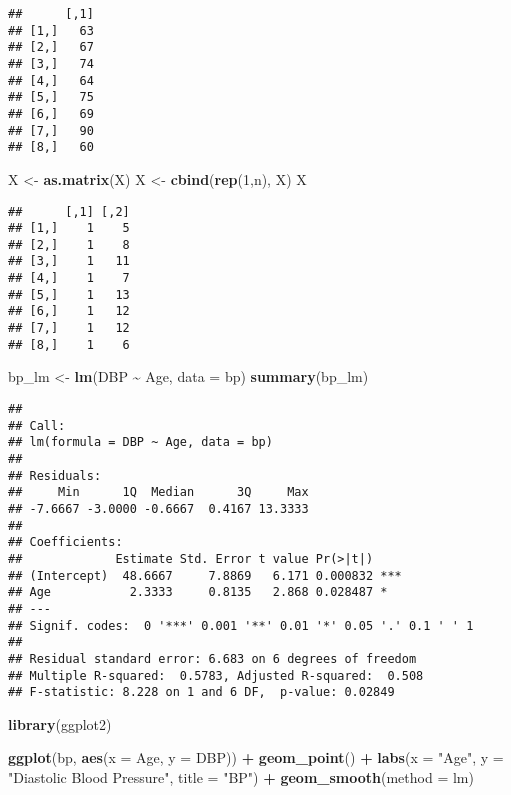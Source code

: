\documentclass[
]{article}
\newenvironment{Shaded}{\begin{snugshade}}{\end{snugshade}}
\newcommand{\AttributeTok}[1]{\textcolor[rgb]{0.13,0.29,0.53}{#1}}
\newcommand{\DecValTok}[1]{\textcolor[rgb]{0.00,0.00,0.81}{#1}}
\newcommand{\FunctionTok}[1]{\textcolor[rgb]{0.13,0.29,0.53}{\textbf{#1}}}
\newcommand{\NormalTok}[1]{#1}
\newcommand{\OtherTok}[1]{\textcolor[rgb]{0.56,0.35,0.01}{#1}}
\newcommand{\SpecialCharTok}[1]{\textcolor[rgb]{0.81,0.36,0.00}{\textbf{#1}}}
\newcommand{\StringTok}[1]{\textcolor[rgb]{0.31,0.60,0.02}{#1}}
\begin{document}
\begin{verbatim}
##      [,1]
## [1,]   63
## [2,]   67
## [3,]   74
## [4,]   64
## [5,]   75
## [6,]   69
## [7,]   90
## [8,]   60
\end{verbatim}

\begin{Shaded}
\begin{Highlighting}[]
\NormalTok{X }\OtherTok{\textless{}{-}} \FunctionTok{as.matrix}\NormalTok{(X)}
\NormalTok{X }\OtherTok{\textless{}{-}} \FunctionTok{cbind}\NormalTok{(}\FunctionTok{rep}\NormalTok{(}\DecValTok{1}\NormalTok{,n), X)}
\NormalTok{X}
\end{Highlighting}
\end{Shaded}

\begin{verbatim}
##      [,1] [,2]
## [1,]    1    5
## [2,]    1    8
## [3,]    1   11
## [4,]    1    7
## [5,]    1   13
## [6,]    1   12
## [7,]    1   12
## [8,]    1    6
\end{verbatim}

\begin{Shaded}
\begin{Highlighting}[]
\NormalTok{bp\_lm }\OtherTok{\textless{}{-}} \FunctionTok{lm}\NormalTok{(DBP }\SpecialCharTok{\textasciitilde{}}\NormalTok{ Age, }\AttributeTok{data =}\NormalTok{ bp)}
\FunctionTok{summary}\NormalTok{(bp\_lm)}
\end{Highlighting}
\end{Shaded}

\begin{verbatim}
## 
## Call:
## lm(formula = DBP ~ Age, data = bp)
## 
## Residuals:
##     Min      1Q  Median      3Q     Max 
## -7.6667 -3.0000 -0.6667  0.4167 13.3333 
## 
## Coefficients:
##             Estimate Std. Error t value Pr(>|t|)    
## (Intercept)  48.6667     7.8869   6.171 0.000832 ***
## Age           2.3333     0.8135   2.868 0.028487 *  
## ---
## Signif. codes:  0 '***' 0.001 '**' 0.01 '*' 0.05 '.' 0.1 ' ' 1
## 
## Residual standard error: 6.683 on 6 degrees of freedom
## Multiple R-squared:  0.5783, Adjusted R-squared:  0.508 
## F-statistic: 8.228 on 1 and 6 DF,  p-value: 0.02849
\end{verbatim}

\begin{Shaded}
\begin{Highlighting}[]
\FunctionTok{library}\NormalTok{(ggplot2)}

\FunctionTok{ggplot}\NormalTok{(bp, }\FunctionTok{aes}\NormalTok{(}\AttributeTok{x =}\NormalTok{ Age, }\AttributeTok{y =}\NormalTok{ DBP)) }\SpecialCharTok{+}
  \FunctionTok{geom\_point}\NormalTok{() }\SpecialCharTok{+}
  \FunctionTok{labs}\NormalTok{(}\AttributeTok{x =} \StringTok{"Age"}\NormalTok{, }\AttributeTok{y =} \StringTok{"Diastolic Blood Pressure"}\NormalTok{, }\AttributeTok{title =} \StringTok{"BP"}\NormalTok{) }\SpecialCharTok{+}
  \FunctionTok{geom\_smooth}\NormalTok{(}\AttributeTok{method =}\NormalTok{ lm)}
\end{Highlighting}
\end{Shaded}
\end{document}
